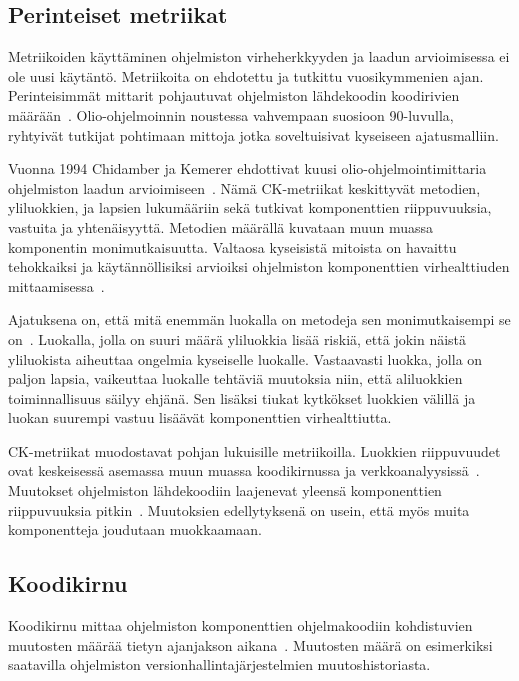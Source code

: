 \documentclass[finnish]{../tktltiki2}
\theoremstyle{definition}
\theoremstyle{remark}
\begin{document}
\subsection{Perinteiset metriikat}

Metriikoiden käyttäminen ohjelmiston virheherkkyyden ja laadun arvioimisessa ei ole uusi käytäntö. Metriikoita on 
ehdotettu ja tutkittu vuosikymmenien ajan. Perinteisimmät mittarit pohjautuvat ohjelmiston lähdekoodin koodirivien 
määrään~\cite{BBM96}. Olio-ohjelmoinnin noustessa vahvempaan suosioon 90-luvulla, ryhtyivät tutkijat pohtimaan mittoja 
jotka soveltuisivat kyseiseen ajatusmalliin.

    Vuonna 1994 Chidamber ja Kemerer ehdottivat kuusi olio-ohjelmointimit\-taria ohjelmiston laadun 
arvioimiseen~\cite{CK94}. Nämä CK-metriikat keskittyvät metodien, yliluokkien, ja lapsien lukumääriin sekä tutkivat 
komponenttien riippuvuuksia, vastuita ja yhtenäisyyttä. Metodien määrällä kuvataan muun muassa komponentin 
monimutkaisuutta. Valtaosa kyseisistä mitoista on havaittu tehokkaiksi ja käytännöllisiksi arvioiksi ohjelmiston 
komponenttien virhealttiuden mittaamisessa~\cite{BBM96}.

    Ajatuksena on, että mitä enemmän luokalla on metodeja sen monimutkaisempi se on~\cite{BBM96}. Luokalla, jolla on 
suuri määrä yliluokkia lisää riskiä, että jokin näistä yliluokista aiheuttaa ongelmia kyseiselle luokalle. Vastaavasti 
luokka, jolla on paljon lapsia, vaikeuttaa luokalle tehtäviä muutoksia niin, että aliluokkien toiminnallisuus säilyy 
ehjänä. Sen lisäksi tiukat kytkökset luokkien välillä ja luokan suurempi vastuu lisäävät komponenttien virhealttiutta.

    CK-metriikat muodostavat pohjan lukuisille metriikoilla. Luokkien riippuvuudet ovat keskeisessä asemassa muun muassa 
koodikirnussa ja verkkoanalyysissä~\cite{NB05, NB07, ZN08}. Muutokset ohjelmiston lähdekoodiin laajenevat yleensä 
komponenttien riippuvuuksia pitkin~\cite{NB05, NB07}. Muutoksien edellytyksenä on usein, että myös muita komponentteja 
joudutaan muokkaamaan.

\subsection{Koodikirnu}

Koodikirnu mittaa ohjelmiston komponenttien ohjelmakoodiin kohdistuvien muutosten määrää tietyn ajanjakson 
aikana~\cite{NB05}. Muutosten määrä on esimerkiksi saatavilla ohjelmiston versionhallintajärjestelmien 
muutoshistoriasta.
\end{document}
